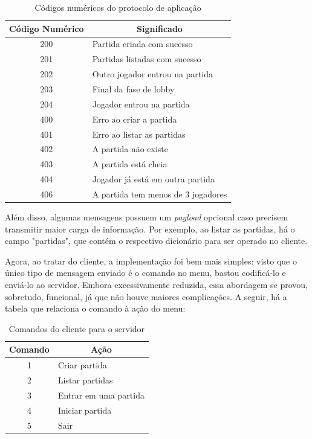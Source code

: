 \documentclass[11pt,a4paper]{article}
\begin{document}
\begin{table}[h!]
    \centering
    \caption{Códigos numéricos do protocolo de aplicação}
    \label{tab:codigos_protocolo}
    \begin{tabular}{|c|l|}
        \hline
        \textbf{Código Numérico} & \multicolumn{1}{c|}{\textbf{Significado}} \\ \hline
        200 & Partida criada com sucesso\\ \hline
        201 & Partidas listadas com sucesso \\ \hline
        202 & Outro jogador entrou na partida \\ \hline
        203 & Final da fase de lobby \\ \hline
        204 & Jogador entrou na partida \\ \hline
        400 & Erro ao criar a partida \\ \hline
        401 & Erro ao listar as partidas \\ \hline
        402 & A partida não existe \\ \hline
        403 & A partida está cheia \\ \hline
        404 & Jogador já está em outra partida \\ \hline 
        406 & A partida tem menos de 3 jogadores \\ \hline
    \end{tabular}
\end{table}

Além disso, algumas mensagens possuem um \textit{payload} opcional caso precisem transmitir maior carga de informação. Por exemplo, ao listar as partidas, há o campo "partidas", que contém o respectivo dicionário para ser operado no cliente.

Agora, ao tratar do cliente, a implementação foi bem mais simples: visto que o único tipo de mensagem enviado é o comando no menu, bastou codificá-lo e enviá-lo ao servidor. Embora excessivamente reduzida, essa abordagem se provou, sobretudo, funcional, já que não houve maiores complicações. A seguir, há a tabela que relaciona o comando à ação do menu:

\begin{table}[h!]
    \centering
    \caption{Comandos do cliente para o servidor}
    \label{tab:codigos_protocolo}
    \begin{tabular}{|c|l|}
        \hline
        \textbf{Comando} & \multicolumn{1}{c|}{\textbf{Ação}} \\ \hline
        1 & Criar partida\\ \hline
        2 & Listar partidas \\ \hline
        3 & Entrar em uma partida \\ \hline
        4 & Iniciar partida \\ \hline
        5 & Sair \\ \hline
    \end{tabular}
\end{table}
\end{document}

